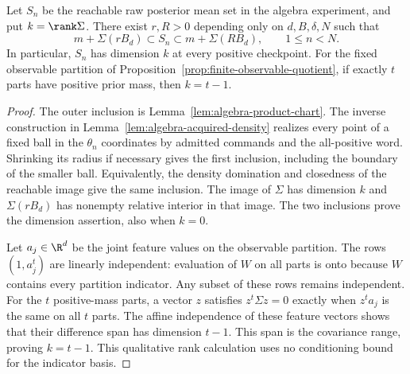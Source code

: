 \begin{proposition}
\label{prop:algebra-saturation}
Let $S_n$ be the reachable raw posterior mean set in the algebra
experiment, and put $k=\rank\Sigma$. There exist $r,R>0$ depending
only on $d,B,\delta,N$ such that
\begin{equation}\label{eq:algebra-saturated-sandwich}
 m+\Sigma(rB_d)\subset S_n\subset m+\Sigma(RB_d),
                 \qquad 1\le n<N.
\end{equation}
In particular, $S_n$ has dimension $k$ at every positive checkpoint.
For the fixed observable partition of
Proposition~\ref{prop:finite-observable-quotient}, if exactly $t$ parts
have positive prior mass, then $k=t-1$.
\end{proposition}
\begin{proof}
The outer inclusion is Lemma~\ref{lem:algebra-product-chart}.
The inverse construction in
Lemma~\ref{lem:algebra-acquired-density} realizes every point of a
fixed ball in the $\theta_n$ coordinates by admitted commands and the
all-positive word. Shrinking its radius if necessary gives the first
inclusion, including the boundary of the smaller ball. Equivalently,
the density domination and closedness of the reachable image give the
same inclusion. The image of $\Sigma$ has dimension $k$ and
$\Sigma(rB_d)$ has nonempty relative interior in that image. The
two inclusions prove the dimension assertion, also when $k=0$.

Let $a_j\in\R^d$ be the joint feature values on the observable
partition. The rows $(1,a_j^t)$ are linearly independent: evaluation
of $W$ on all parts is onto because $W$ contains every partition
indicator. Any subset of these rows remains independent. For the
$t$ positive-mass parts, a vector $z$ satisfies $z^t\Sigma z=0$
exactly when $z^ta_j$ is the same on all $t$ parts. The affine
independence of these feature vectors shows that their difference
span has dimension $t-1$. This span is the covariance range, proving
$k=t-1$. This qualitative rank calculation uses no conditioning bound
for the indicator basis.
\end{proof}

